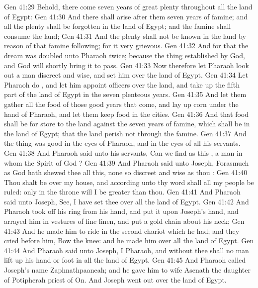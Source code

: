 \vs Gen 41:29 Behold, there come seven years of great plenty throughout all the land of Egypt:
\vs Gen 41:30 And there shall arise after them seven years of famine; and all the plenty shall be forgotten in the land of Egypt; and the famine shall consume the land;
\vs Gen 41:31 And the plenty shall not be known in the land by reason of that famine following; for it  very grievous.
\vs Gen 41:32 And for that the dream was doubled unto Pharaoh twice;  because the thing  established by God, and God will shortly bring it to pass.
\vs Gen 41:33 Now therefore let Pharaoh look out a man discreet and wise, and set him over the land of Egypt.
\vs Gen 41:34 Let Pharaoh do , and let him appoint officers over the land, and take up the fifth part of the land of Egypt in the seven plenteous years.
\vs Gen 41:35 And let them gather all the food of those good years that come, and lay up corn under the hand of Pharaoh, and let them keep food in the cities.
\vs Gen 41:36 And that food shall be for store to the land against the seven years of famine, which shall be in the land of Egypt; that the land perish not through the famine.
\vs Gen 41:37 And the thing was good in the eyes of Pharaoh, and in the eyes of all his servants.
\vs Gen 41:38 And Pharaoh said unto his servants, Can we find  as this , a man in whom the Spirit of God ?
\vs Gen 41:39 And Pharaoh said unto Joseph, Forasmuch as God hath shewed thee all this,  none so discreet and wise as thou :
\vs Gen 41:40 Thou shalt be over my house, and according unto thy word shall all my people be ruled: only in the throne will I be greater than thou.
\vs Gen 41:41 And Pharaoh said unto Joseph, See, I have set thee over all the land of Egypt.
\vs Gen 41:42 And Pharaoh took off his ring from his hand, and put it upon Joseph's hand, and arrayed him in vestures of fine linen, and put a gold chain about his neck;
\vs Gen 41:43 And he made him to ride in the second chariot which he had; and they cried before him, Bow the knee: and he made him  over all the land of Egypt.
\vs Gen 41:44 And Pharaoh said unto Joseph, I  Pharaoh, and without thee shall no man lift up his hand or foot in all the land of Egypt.
\vs Gen 41:45 And Pharaoh called Joseph's name Zaphnathpaaneah; and he gave him to wife Asenath the daughter of Potipherah priest of On. And Joseph went out over  the land of Egypt.
